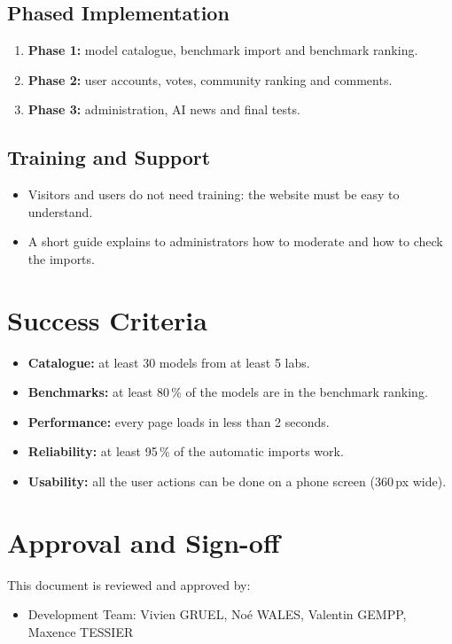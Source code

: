\documentclass[11pt,a4paper]{article}
\begin{document}
\subsection{Phased Implementation}

\begin{enumerate}
  \item \textbf{Phase 1:} model catalogue, benchmark import and benchmark ranking.
  \item \textbf{Phase 2:} user accounts, votes, community ranking and comments.
  \item \textbf{Phase 3:} administration, AI news and final tests.
\end{enumerate}

\subsection{Training and Support}

\begin{itemize}
  \item Visitors and users do not need training: the website must be easy to understand.
  \item A short guide explains to administrators how to moderate and how to check the imports.
\end{itemize}

\section{Success Criteria}

\begin{itemize}
  \item \textbf{Catalogue:} at least 30 models from at least 5 labs.
  \item \textbf{Benchmarks:} at least 80\,\% of the models are in the benchmark ranking.
  \item \textbf{Performance:} every page loads in less than 2 seconds.
  \item \textbf{Reliability:} at least 95\,\% of the automatic imports work.
  \item \textbf{Usability:} all the user actions can be done on a phone screen (360\,px wide).
\end{itemize}

\section{Approval and Sign-off}

This document is reviewed and approved by:
\begin{itemize}
  \item Development Team: Vivien GRUEL, Noé WALES, Valentin GEMPP, Maxence TESSIER
\end{itemize}
\end{document}
